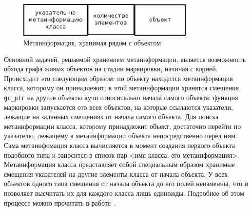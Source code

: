 \begin{figure}[h!]
	\centering
	\includegraphics[width=250pt]{Berezun/images/objectMeta.png}
	\caption{Метаинформация, хранимая рядом с объектом}
\end{figure}

Основной задачей, решаемой хранением метаинформации, является возможность обхода графа живых объектов на стадии маркировки,
начиная с корней. Происходит это следующим образом: по объекту находится метаинформация класса, которому он принадлежит;
в этой метаинформации хранятся смещения \lstinline[language= cpp]{gc_ptr} на другие объекты кучи относительно начала
самого объекта; функция маркировки запускается ото всех объектов, на которые ссылаются указатели,
лежащие на заданных смещениях от начала самого объекта.
Для поиска метаинформации класса, которому принадлежит объект, достаточно перейти по указателю, лежащему в метаинформации
объекта непосредственно перед ним.
Сама метаинфомация класса вычисляется в момент создания первого объекта подобного типа и заносится в список пар
<имя класса, его метаинформация>. Метаинформация класса представляет собой специальным образом хранимые смещения
указателей на другие элементы класса от начала объекта. У всех объектов одного типа смещения от начала объекта до его полей
неизменны, что и позволяет высчитать их для каждого класса лишь единожды.
Подробнее об этом процессе можно прочитать в работе~\cite{kren}.

